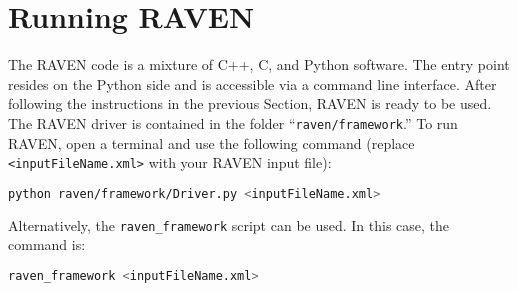 \section{Running RAVEN}

The RAVEN code is a mixture of C++, C, and Python software. The entry point
resides on the Python side and is accessible via a command line interface.
%
After following the instructions in the previous Section, RAVEN is ready to be
used.
%
The RAVEN driver is contained in the folder ``\texttt{raven/framework}.''
%
To run RAVEN, open a terminal and use the following command (replace \texttt{<inputFileName.xml>} with your RAVEN input file):

\begin{lstlisting}[language=bash]
python raven/framework/Driver.py <inputFileName.xml>
\end{lstlisting}

Alternatively, the \texttt{raven\_framework} script can be used.  In this case, the command is:

\begin{lstlisting}[language=bash]
raven_framework <inputFileName.xml>
\end{lstlisting}

